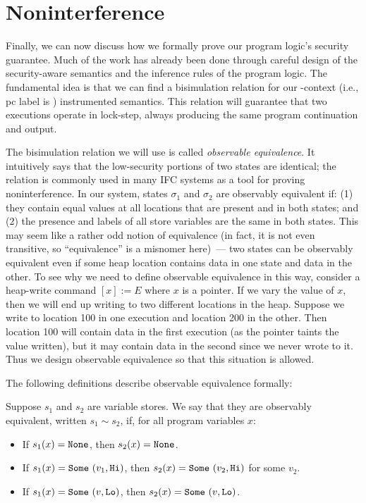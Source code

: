 \section{Noninterference}
\label{noninterference}

Finally, we can now discuss how we formally prove our program logic's security guarantee.
Much of the work has already been done through careful design of the security-aware semantics and
the inference rules of the program logic. The fundamental idea is that we can find a bisimulation
relation for our \lo{}-context (i.e., pc label is \lo{}) instrumented semantics. This relation 
will guarantee that two executions operate in lock-step, always producing the same program 
continuation and output.

The bisimulation relation we will use is called \emph{observable equivalence}. It intuitively says 
that the low-security portions of two states are identical; the relation is commonly used in 
many IFC systems as a tool for proving noninterference. In our system, states $\sigma_1$ and $\sigma_2$ 
are observably equivalent if: (1) they contain equal values at all locations that are present and 
\lo{} in both states; and (2) the presence and labels of all store variables are the same in both
states. This may seem like a rather odd notion of equivalence (in fact, it is not even transitive, so
``equivalence'' is a misnomer here)~--- two states can be observably equivalent even if some heap
location contains \hi{} data in one state and \lo{} data in the other. To see why we need to define
observable equivalence in this way, consider a heap-write command $[x]:=E$ where $x$ is a \hi{}
pointer. If we vary the value of $x$, then we will end up writing to two different locations in the 
heap. Suppose we write to location 100 in one execution and location 200 in the other. Then
location 100 will contain \hi{} data in the first execution (as the \hi{} pointer taints the 
value written), but it may contain \lo{} data in the second since we never wrote to it. Thus we design 
observable equivalence so that this situation is allowed.

The following definitions describe observable equivalence formally:

\vspace{2mm}
\begin{definition}
Suppose $s_1$ and $s_2$ are variable stores. We say that they are observably equivalent, written
$s_1 \sim s_2$, if, for all program variables $x$:
\begin{itemize}
\item If $s_1(x) = \text{\tt{None}}{}$, then $s_2(x) = \text{\tt{None}}{}$.
\item If $s_1(x) = \text{\tt{Some}} \,\, (v_1,\text{\tt{Hi}}{})$, then $s_2(x) = \text{\tt{Some}} \,\, (v_2,\text{\tt{Hi}}{})$ for some $v_2$.
\item If $s_1(x) = \text{\tt{Some}} \,\, (v,\text{\tt{Lo}}{})$, then $s_2(x) = \text{\tt{Some}} \,\, (v,\text{\tt{Lo}}{})$.
\end{itemize}
\end{definition}

